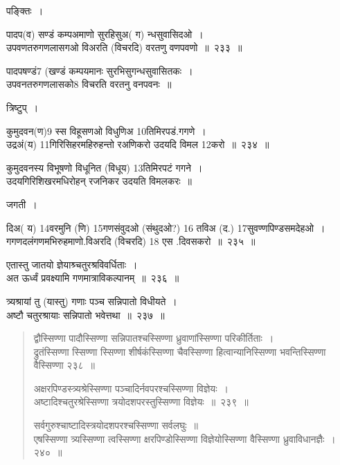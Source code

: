 \documentclass[11pt, openany]{book}
\begin{document}
पङ्क्तिः~। 

{\na पादप(व) सण्डं कम्पअमाणो सुरहिसुअ( ग) न्धसुवासिदओ~।\\
उपवणतरुगणलासगओ विअरति (विचरदि) वरतणु वणपवणो~॥~२३३~॥}

{\qt पादपषण्डं7 (खण्डं कम्पयमानः सुरभिसुगन्धसुवासितकः~।\\
उपवनतरुगणलासको8 विचरति वरतनु वनपवनः~॥}

त्रिष्टुप्~। 

{\na कुमुदवन(ण)9 स्स विहूसणओ विधुणिअ 10तिमिरपडं.गगणे~।\\
 उद्रअं(य) 11गिरिसिहरमहिरुहन्तो रअणिकरो उदयदि विमल 12करो~॥~२३४~॥}

{\qt कुमुदवनस्य विभूषणो विधूनित (विधूय) 13तिमिरपटं गगने~।\\
उदयगिरिशिखरमधिरोहन् रजनिकर उदयति विमलकरः~॥}

 जगती~। 

{\na दिअ( य) 14वरमुनि (णि) 15गणसंवुदओ (संथुदओ?) 16 तविअ (द.) 17सुवण्णपिण्डसमदेहओ~।\\
गगणदलंगणमभिरुहमाणो.विअरदि (विचरदि) 18 एस .दिवसकरो~॥~२३५~॥}

{}

{ एतास्तु जातयो ज्ञेयाश्र्चतुरश्रविवर्धिताः~।\\
अत ऊर्ध्वं प्रवक्ष्यामि गणमात्राविकल्पानम्~॥~२३६~॥

त्र्यश्रायां तु (यास्तु) गणाः पञ्च सन्निपातो विधीयते~।\\
अष्टौ चतुरश्रायाः सन्निपातो भवेत्तथा~॥~२३७~॥}


\newpage

\begin{quote}
{\na द्वौस्सिण्णा पादौस्सिण्णा सन्निपातश्चस्सिण्णा ध्रुवाणांस्सिण्णा परिकीर्तिताः~।\\
द्रुतंस्सिण्णा स्सिण्णा स्सिण्णा शीर्षकंस्सिण्णा चैवस्सिण्णा हित्वान्यानिस्सिण्णा भवन्तिस्सिण्णा वैस्सिण्णा २३८~॥

अक्षरपिण्डस्त्र्यश्रेस्सिण्णा पञ्चादिर्नवपरश्चस्सिण्णा विज्ञेयः~।\\
अष्टादिश्चतुरश्रेस्सिण्णा त्रयोदशपरस्तुस्सिण्णा विज्ञेयः~॥~२३९~॥

सर्वगुरुश्चाष्टादिस्त्रयोदशपरश्चस्सिण्णा सर्वलघुः~॥\\
एषस्सिण्णा त्र्यस्सिण्णा त्वस्सिण्णा क्षरपिण्डोस्सिण्णा विज्ञेयोस्सिण्णा वैस्सिण्णा ध्रुवाविधानज्ञैः~।२४०~॥}
\end{quote}
\end{document}
